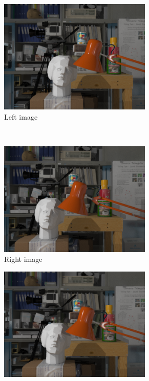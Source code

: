 \begin{figure}[h!]
\centering
\begin{subfigure}[]{0.4\textwidth}
\centering
\includegraphics[width=0.8\textwidth]{./img/left_watermarked.png}
\caption{\small{Left image}}
\label{fig:vs1}
\end{subfigure}%
~ %
\begin{subfigure}[]{0.4\textwidth}
\centering
\includegraphics[width= 0.8\textwidth]{./img/right_watermarked.png}
\caption{\small{Right image}}
\label{fig:vs2}
  \end{subfigure}
\begin{subfigure}[]{0.4\textwidth}
\centering
\includegraphics[width=0.8\textwidth]{./img/synth_view_watermarked.png}

\end{subfigure}
\end{figure}
